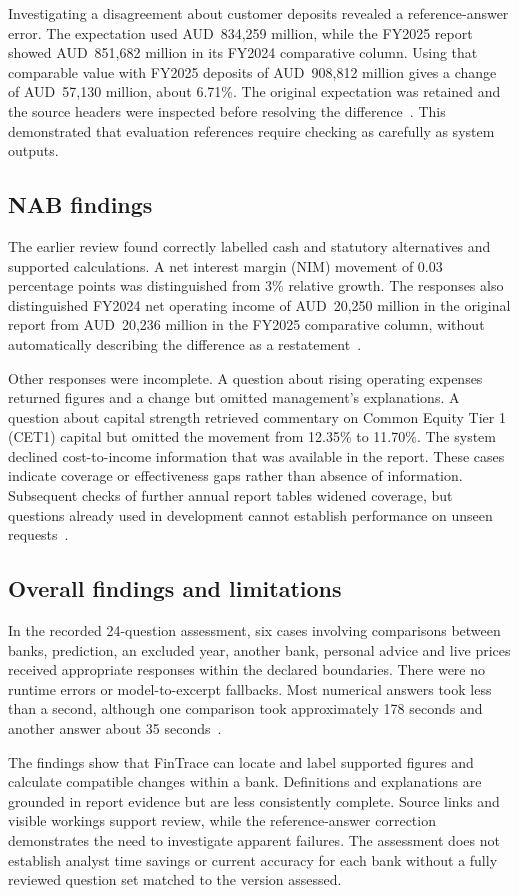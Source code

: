 Investigating a disagreement about customer deposits revealed a reference-answer error. The expectation used AUD~834,259 million, while the FY2025 report showed AUD~851,682 million in its FY2024 comparative column. Using that comparable value with FY2025 deposits of AUD~908,812 million gives a change of AUD~57,130 million, about 6.71\%. The original expectation was retained and the source headers were inspected before resolving the difference~\cite{fintraceCandidate2026}. This demonstrated that evaluation references require checking as carefully as system outputs.

\subsection{NAB findings}
The earlier review found correctly labelled cash and statutory alternatives and supported calculations. A net interest margin (NIM) movement of 0.03 percentage points was distinguished from 3\% relative growth. The responses also distinguished FY2024 net operating income of AUD~20,250 million in the original report from AUD~20,236 million in the FY2025 comparative column, without automatically describing the difference as a restatement~\cite{fintraceReleaseReview2026}.

Other responses were incomplete. A question about rising operating expenses returned figures and a change but omitted management's explanations. A question about capital strength retrieved commentary on Common Equity Tier 1 (CET1) capital but omitted the movement from 12.35\% to 11.70\%. The system declined cost-to-income information that was available in the report. These cases indicate coverage or effectiveness gaps rather than absence of information. Subsequent checks of further annual report tables widened coverage, but questions already used in development cannot establish performance on unseen requests~\cite{fintraceCoverage2026}.

\subsection{Overall findings and limitations}
In the recorded 24-question assessment, six cases involving comparisons between banks, prediction, an excluded year, another bank, personal advice and live prices received appropriate responses within the declared boundaries. There were no runtime errors or model-to-excerpt fallbacks. Most numerical answers took less than a second, although one comparison took approximately 178 seconds and another answer about 35 seconds~\cite{fintraceReleaseReview2026}.

The findings show that FinTrace can locate and label supported figures and calculate compatible changes within a bank. Definitions and explanations are grounded in report evidence but are less consistently complete. Source links and visible workings support review, while the reference-answer correction demonstrates the need to investigate apparent failures. The assessment does not establish analyst time savings or current accuracy for each bank without a fully reviewed question set matched to the version assessed.
